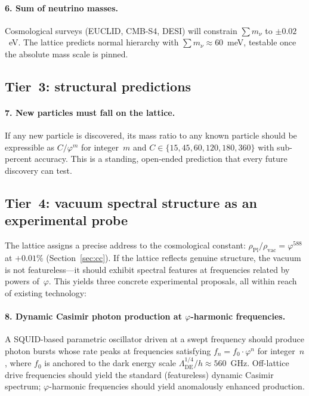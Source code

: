 \documentclass[12pt,a4paper]{article}
\newcommand{\vp}{\varphi}
\begin{document}
\paragraph{6. Sum of neutrino masses.}
Cosmological surveys (EUCLID, CMB-S4, DESI) will constrain
$\sum m_\nu$ to $\pm 0.02$~eV.  The lattice predicts normal hierarchy
with $\sum m_\nu \approx 60$~meV, testable once the absolute mass scale is
pinned.

\subsection{Tier~3: structural predictions}

\paragraph{7. New particles must fall on the lattice.}
If any new particle is discovered, its mass ratio to any known particle should
be expressible as $C/\vp^m$ for integer~$m$ and $C \in \{15, 45, 60, 120,
180, 360\}$ with sub-percent accuracy.  This is a standing, open-ended
prediction that every future discovery can test.

\subsection{Tier~4: vacuum spectral structure as an experimental probe}
\label{sec:vacuum}

The lattice assigns a precise address to the cosmological constant:
$\rho_{\mathrm{Pl}}/\rho_{\mathrm{vac}} = \vp^{588}$ at $+0.01\%$
(Section~\ref{sec:cc}).  If the lattice reflects genuine structure, the
vacuum is not featureless---it should exhibit spectral features at frequencies
related by powers of~$\vp$.  This yields three concrete experimental
proposals, all within reach of existing technology:

\paragraph{8. Dynamic Casimir photon production at $\vp$-harmonic
frequencies.}
A SQUID-based parametric oscillator driven at a swept frequency should
produce photon bursts whose rate peaks at frequencies satisfying
$f_n = f_0 \cdot \vp^n$ for integer~$n$, where $f_0$ is anchored to the
dark energy scale $\Lambda_{\mathrm{DE}}^{1/4}/h \approx 560$~GHz.
Off-lattice drive frequencies should yield the standard (featureless)
dynamic Casimir spectrum; $\vp$-harmonic frequencies should yield
anomalously enhanced production.
\end{document}
